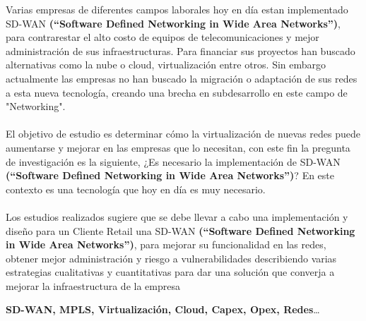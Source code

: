 Varias empresas de diferentes campos laborales hoy en día estan implementado SD-WAN \textbf{(“Software Defined Networking in Wide Area Networks”)}, para contrarestar el alto costo de equipos de telecomunicaciones y mejor administración de sus infraestructuras. Para financiar sus proyectos han buscado alternativas como la nube o cloud, virtualización entre otros. Sin embargo actualmente las empresas no han buscado la migración o adaptación de sus redes a esta nueva tecnología, creando una brecha en subdesarrollo en este campo de "Networking". 
\\
\\
El objetivo de estudio es determinar cómo la virtualización de nuevas redes puede aumentarse y mejorar en las empresas que lo necesitan, con este fin la pregunta de investigación es la siguiente, ¿Es necesario la implementación de SD-WAN \textbf{(“Software Defined Networking in Wide Area Networks”)}? En este contexto es una tecnología que hoy en día es muy necesario.
\\
\\
Los estudios realizados sugiere que se debe llevar a cabo una implementación y diseño para un Cliente Retail una SD-WAN \textbf{(“Software Defined Networking in Wide Area Networks”)}, para mejorar su funcionalidad en las redes, obtener mejor administración y riesgo a vulnerabilidades describiendo varias estrategias cualitativas y cuantitativas para dar una solución que converja a mejorar la infraestructura de la empresa

\begin{keywords}
\textbf{SD-WAN, MPLS, Virtualización, Cloud, Capex, Opex, Redes}\ldots
\end{keywords}
